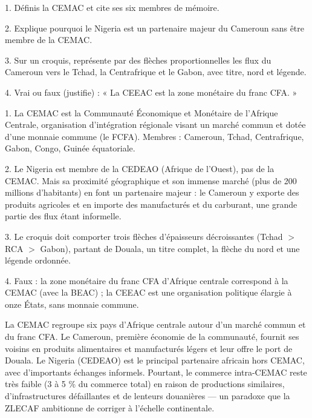 \documentclass[11pt]{article}
\begin{document}
\begin{exercice}
1. Définis la CEMAC et cite ses six membres de mémoire.\par
2. Explique pourquoi le Nigeria est un partenaire majeur du Cameroun sans être membre de la CEMAC.\par
3. Sur un croquis, représente par des flèches proportionnelles les flux du Cameroun vers le Tchad, la Centrafrique et le Gabon, avec titre, nord et légende.\par
4. Vrai ou faux (justifie) : « La CEEAC est la zone monétaire du franc CFA. »
\end{exercice}

\begin{corrige}[Exercice]
1. La CEMAC est la Communauté Économique et Monétaire de l'Afrique Centrale, organisation d'intégration régionale visant un marché commun et dotée d'une monnaie commune (le FCFA). Membres : Cameroun, Tchad, Centrafrique, Gabon, Congo, Guinée équatoriale.\par
2. Le Nigeria est membre de la CEDEAO (Afrique de l'Ouest), pas de la CEMAC. Mais sa proximité géographique et son immense marché (plus de 200 millions d'habitants) en font un partenaire majeur : le Cameroun y exporte des produits agricoles et en importe des manufacturés et du carburant, une grande partie des flux étant informelle.\par
3. Le croquis doit comporter trois flèches d'épaisseurs décroissantes (Tchad $>$ RCA $>$ Gabon), partant de Douala, un titre complet, la flèche du nord et une légende ordonnée.\par
4. Faux : la zone monétaire du franc CFA d'Afrique centrale correspond à la CEMAC (avec la BEAC) ; la CEEAC est une organisation politique élargie à onze États, sans monnaie commune.
\end{corrige}

\begin{aretenir}
La CEMAC regroupe six pays d'Afrique centrale autour d'un marché commun et du franc CFA. Le Cameroun, première économie de la communauté, fournit ses voisins en produits alimentaires et manufacturés légers et leur offre le port de Douala. Le Nigeria (CEDEAO) est le principal partenaire africain hors CEMAC, avec d'importants échanges informels. Pourtant, le commerce intra-CEMAC reste très faible (3 à 5 \% du commerce total) en raison de productions similaires, d'infrastructures défaillantes et de lenteurs douanières — un paradoxe que la ZLECAF ambitionne de corriger à l'échelle continentale.
\end{aretenir}
\end{document}
